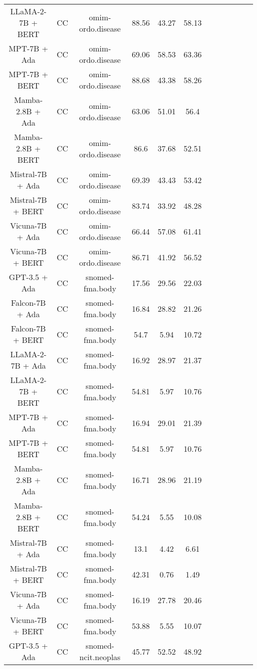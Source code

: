 \begin{table}
\begin{tabular}{|c|c|c|c|c|c|c|c|c|c|c|c|}
	LLaMA-2-7B + BERT  & CC & omim-ordo.disease  &  88.56 &  43.27 & 58.13  \\
	MPT-7B + Ada  & CC & omim-ordo.disease  &  69.06 &  58.53 & 63.36  \\
	MPT-7B + BERT  & CC & omim-ordo.disease  &  88.68 &  43.38 & 58.26  \\
	Mamba-2.8B + Ada  & CC & omim-ordo.disease  &  63.06 &  51.01 & 56.4  \\
	Mamba-2.8B + BERT  & CC & omim-ordo.disease  &  86.6 &  37.68 & 52.51  \\
	Mistral-7B + Ada  & CC & omim-ordo.disease  &  69.39 &  43.43 & 53.42  \\
	Mistral-7B + BERT  & CC & omim-ordo.disease  &  83.74 &  33.92 & 48.28  \\
	Vicuna-7B + Ada  & CC & omim-ordo.disease  &  66.44 &  57.08 & 61.41  \\
	Vicuna-7B + BERT  & CC & omim-ordo.disease  &  86.71 &  41.92 & 56.52  \\
	\hline
	GPT-3.5 + Ada  & CC & snomed-fma.body  &  17.56 &  29.56 & 22.03  \\
	Falcon-7B + Ada  & CC & snomed-fma.body  &  16.84 &  28.82 & 21.26  \\
	Falcon-7B + BERT  & CC & snomed-fma.body  &  54.7 &  5.94 & 10.72  \\
	LLaMA-2-7B + Ada  & CC & snomed-fma.body  &  16.92 &  28.97 & 21.37  \\
	LLaMA-2-7B + BERT  & CC & snomed-fma.body  &  54.81 &  5.97 & 10.76  \\
	MPT-7B + Ada  & CC & snomed-fma.body  &  16.94 &  29.01 & 21.39  \\
	MPT-7B + BERT  & CC & snomed-fma.body  &  54.81 &  5.97 & 10.76  \\
	Mamba-2.8B + Ada  & CC & snomed-fma.body  &  16.71 &  28.96 & 21.19  \\
	Mamba-2.8B + BERT  & CC & snomed-fma.body  &  54.24 &  5.55 & 10.08  \\
	Mistral-7B + Ada  & CC & snomed-fma.body  &  13.1 &  4.42 & 6.61  \\
	Mistral-7B + BERT  & CC & snomed-fma.body  &  42.31 &  0.76 & 1.49  \\
	Vicuna-7B + Ada  & CC & snomed-fma.body  &  16.19 &  27.78 & 20.46  \\
	Vicuna-7B + BERT  & CC & snomed-fma.body  &  53.88 &  5.55 & 10.07  \\
	\hline
	GPT-3.5 + Ada  & CC & snomed-ncit.neoplas  &  45.77 &  52.52 & 48.92  \\

\end{tabular}
\end{table}
